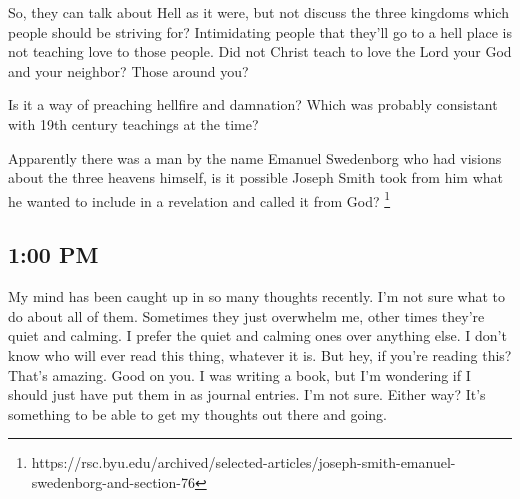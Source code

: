 So, they can talk about Hell as it were, but not discuss the three kingdoms which
people should be striving for? Intimidating people that they'll go to a hell place 
is not teaching love to those people. Did not Christ teach to love the Lord your God
and your neighbor? Those around you?

Is it a way of preaching hellfire and damnation? Which was probably consistant with
19th century teachings at the time?

Apparently there was a man by the name Emanuel Swedenborg who had visions about the
three heavens himself, is it possible Joseph Smith took from him what he wanted to
include in a revelation and called it from God?
\footnote{https://rsc.byu.edu/archived/selected-articles/joseph-smith-emanuel-swedenborg-and-section-76}

\subsection{1:00 PM}

My mind has been caught up in so many thoughts recently. I'm not sure what to do
about all of them. Sometimes they just overwhelm me, other times they're quiet and
calming. I prefer the quiet and calming ones over anything else. I don't know who
will ever read this thing, whatever it is. But hey, if you're reading this? That's
amazing. Good on you. I was writing a book, but I'm wondering if I should just have
put them in as journal entries. I'm not sure. Either way? It's something to be able
to get my thoughts out there and going.
